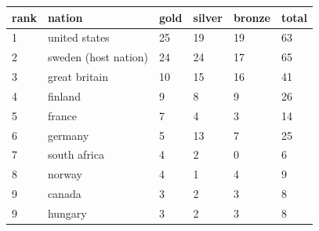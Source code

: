 \documentclass{article}
\begin{document}
\begin{tabular}{llllll}
\toprule
rank & nation & gold & silver & bronze & total \\
\midrule
1 & united states & 25 & 19 & 19 & 63 \\
2 & sweden (host nation) & 24 & 24 & 17 & 65 \\
3 & great britain & 10 & 15 & 16 & 41 \\
4 & finland & 9 & 8 & 9 & 26 \\
5 & france & 7 & 4 & 3 & 14 \\
6 & germany & 5 & 13 & 7 & 25 \\
7 & south africa & 4 & 2 & 0 & 6 \\
8 & norway & 4 & 1 & 4 & 9 \\
9 & canada & 3 & 2 & 3 & 8 \\
9 & hungary & 3 & 2 & 3 & 8 \\
\bottomrule
\end{tabular}
\end{document}
